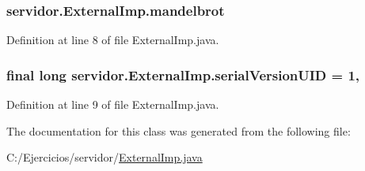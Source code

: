 \subsubsection[{\texorpdfstring{mandelbrot}{mandelbrot}}]{ servidor.\+External\+Imp.\+mandelbrot\hspace{0.3cm}{\ttfamily [private]}}\hypertarget{classservidor_1_1ExternalImp_a5e902f152fac9ceebb5cbc8db1b71f01}{}\label{classservidor_1_1ExternalImp_a5e902f152fac9ceebb5cbc8db1b71f01}


Definition at line 8 of file External\+Imp.\+java.

\subsubsection[{\texorpdfstring{serial\+Version\+U\+ID}{serialVersionUID}}]{\setlength{\rightskip}{0pt plus 5cm}final long servidor.\+External\+Imp.\+serial\+Version\+U\+ID = 1\hspace{0.3cm}{\ttfamily [static]}, {\ttfamily [package]}}\hypertarget{classservidor_1_1ExternalImp_acd2877f2e18786a8a54008ceaa0af042}{}\label{classservidor_1_1ExternalImp_acd2877f2e18786a8a54008ceaa0af042}


Definition at line 9 of file External\+Imp.\+java.



The documentation for this class was generated from the following file\+:\begin{DoxyCompactItemize}
\item 
C\+:/\+Ejercicios/servidor/\hyperlink{ExternalImp_8java}{External\+Imp.\+java}\end{DoxyCompactItemize}
